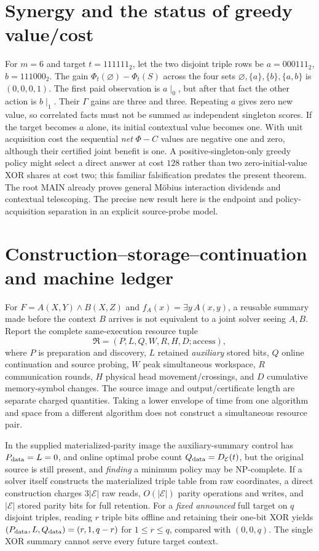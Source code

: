 \documentclass{article}
\begin{document}
\section{Synergy and the status of greedy value/cost}
For $m=6$ and target $t=111111_2$, let the two disjoint triple rows be $a=000111_2$, $b=111000_2$. The gain $\Phi_t(\varnothing)-\Phi_t(S)$ across the four sets $\varnothing,\{a\},\{b\},\{a,b\}$ is $(0,0,0,1)$. The first paid observation is $a\mid_0$, but after that fact the other action is $b\mid_1$. Their $\Gamma$ gains are three and three. Repeating $a$ gives zero new value, so correlated facts must not be summed as independent singleton scores. If the target becomes $a$ alone, its initial contextual value becomes one. With unit acquisition cost the sequential \emph{net} $\Phi-C$ values are negative one and zero, although their certified joint benefit is one. A positive-singleton-only greedy policy might select a direct answer at cost $128$ rather than two zero-initial-value XOR shares at cost two; this familiar falsification predates the present theorem. The root MAIN already proves general M\"obius interaction dividends and contextual telescoping. The precise new result here is the endpoint and policy-acquisition separation in an explicit source-probe model.


\section{Construction--storage--continuation and machine ledger}
For $F=A(X,Y)\land B(X,Z)$ and $f_A(x)=\exists y\,A(x,y)$, a reusable summary made before the context $B$ arrives is not equivalent to a joint solver seeing $A,B$. Report the complete same-execution resource tuple
\[
\mathfrak R=(P,L,Q,W,R,H,D;\mathrm{access}),
\]
where $P$ is preparation and discovery, $L$ retained \emph{auxiliary} stored bits, $Q$ online continuation and source probing, $W$ peak simultaneous workspace, $R$ communication rounds, $H$ physical head movement/crossings, and $D$ cumulative memory-symbol changes. The source image and output/certificate length are separate charged quantities. Taking a lower envelope of time from one algorithm and space from a different algorithm does not construct a simultaneous resource pair.

In the supplied materialized-parity image the auxiliary-summary control has $P_{\rm data}=L=0$, and online optimal probe count $Q_{\rm data}=D_{\mathcal E}(t)$, but the original source is still present, and \emph{finding} a minimum policy may be NP-complete. If a solver itself constructs the materialized triple table from raw coordinates, a direct construction charges $3|\mathcal E|$ raw reads, $O(|\mathcal E|)$ parity operations and writes, and $|\mathcal E|$ stored parity bits for full retention. For a \emph{fixed announced} full target on $q$ disjoint triples, reading $r$ triple bits offline and retaining their one-bit XOR yields $(P_{\rm data},L,Q_{\rm data})=(r,1,q-r)$ for $1\le r\le q$, compared with $(0,0,q)$. The single XOR summary cannot serve every future target context.
\end{document}
